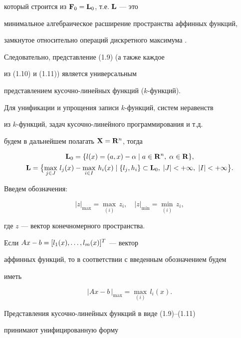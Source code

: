 который строится из $\bold F_0 =\bold L_0$, т.е. $\bold L$ --- это


минимальное алгебраическое расширение пространства аффинных функций,


замкнутое относительно операций дискретного максимума \cite{Plo}.


Следовательно, представление (1.9) (а также каждое


из (1.10) и (1.11)) является универсальным


представлением кусочно-линейных функций ($k$-функций).





Для унификации и упрощения записи $k$-функций, систем неравенств


из $k$-функций, задач кусочно-линейного программирования и т.д.


будем в дальнейшем полагать $\bold X=\bold R^n$, тогда


\begin{gather*}


\bold L_0 = \{ l(x) = (a, x) - \al \mid a \in \R^n,\; \al \in \R \},\\


\bold L = \bigl\{ \max_{j \in J}\, l_j(x) - \max_{i \in I}\,


h_i (x) \mid \{ l_j, h_i \} \su \bold L_0,\;


|J|< +\infty,\; |I|< +\infty\bigr\}.


\end{gather*}





Введем обозначения:\


$$


|z|_{\max} = \max_{(i)}\, z_i,\quad |z|_{\min} =\min_{(i)}\, z_i,


$$


где $z$ --- вектор конечномерного пространства.


Если $Ax -b =[l_1(x),\dotsc,l_m(x)]^T$ --- вектор


аффинных функций, то в соответствии с введенным обозначением будем


иметь


$$


| Ax - b\, |_{\max} = \max_{(i)}\, l_i(x).


$$


Представления кусочно-линейных функций в виде (1.9)--(1.11)


принимают унифицированную форму


